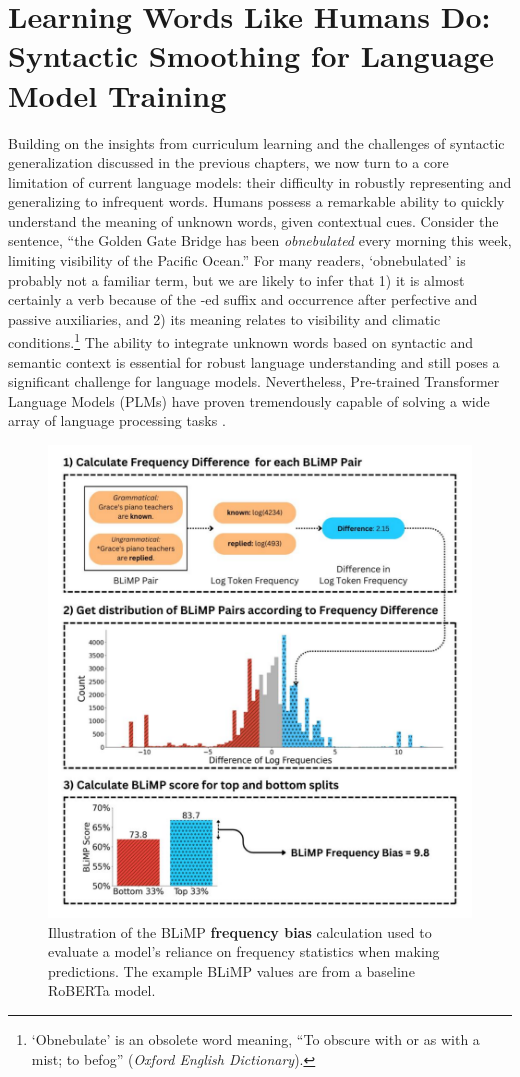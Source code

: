\chapter{Learning Words Like Humans Do: Syntactic Smoothing for Language Model Training}

Building on the insights from curriculum learning and the challenges of syntactic generalization discussed in the previous chapters, we now turn to a core limitation of current language models: their difficulty in robustly representing and generalizing to infrequent words. Humans possess a remarkable ability to quickly understand the meaning of unknown words, given contextual cues. Consider the sentence, ``the Golden Gate Bridge has been \emph{obnebulated} every morning this week, limiting visibility of the Pacific Ocean.'' For many readers, `obnebulated' is probably not a familiar term, but we are likely to infer that 1) it is almost certainly a verb because of the -ed suffix and occurrence after perfective and passive auxiliaries, and 2) its meaning relates to visibility and climatic conditions.\footnote{ `Obnebulate' is an obsolete word meaning, ``To obscure with or as with a mist; to befog'' (\emph{Oxford English Dictionary}).} The ability to integrate unknown words based on syntactic and semantic context is essential for robust language understanding and still poses a significant challenge for language models. Nevertheless, Pre-trained Transformer Language Models (PLMs) have proven tremendously capable of solving a wide array of language processing tasks \citep{touvron2023llama, chowdhery2023palm}. 

\begin{figure}[ht!]
    \centering
    \includegraphics[width=0.8\linewidth]{chapters/syntatic-smoothing/figures/blimp_bias_example.pdf}
    \caption{Illustration of the BLiMP \textbf{frequency bias} calculation used to evaluate a model's reliance on frequency statistics when making predictions. The example BLiMP values are from a baseline RoBERTa model.}
    \label{fig:blimp_bias}
    \vspace{-1em}
\end{figure}

